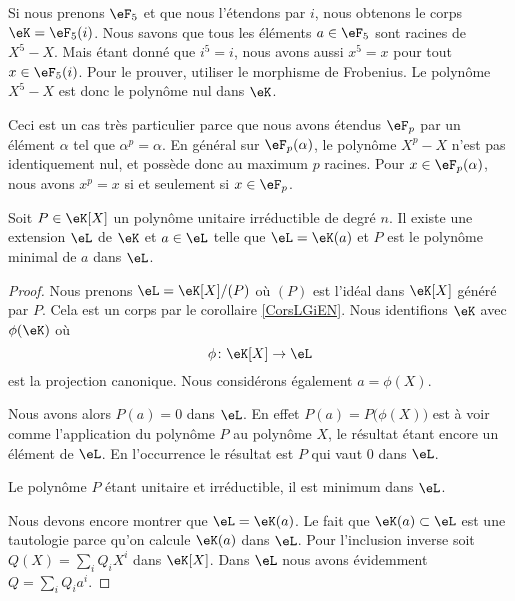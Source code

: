 \begin{example} \label{ExLQhLhJ}
    Si nous prenons \( \eF_5\) et que nous l'étendons par \( i\), nous obtenons le corps \( \eK=\eF_5(i)\). Nous savons que tous les éléments \( a\in \eF_5\) sont racines de \( X^5-X\). Mais étant donné que \( i^5=i\), nous avons aussi \( x^5=x\) pour tout \( x\in \eF_5(i)\). Pour le prouver, utiliser le morphisme de Frobenius. Le polynôme \( X^5-X\) est donc le polynôme nul dans \( \eK\).

    Ceci est un cas très particulier parce que nous avons étendus \( \eF_p\) par un élément \( \alpha\) tel que \( \alpha^p=\alpha\). En général sur \( \eF_p(\alpha)\), le polynôme \( X^p-X\) n'est pas identiquement nul, et possède donc au maximum \( p\) racines. Pour \( x\in \eF_p(\alpha)\), nous avons \( x^p=x\) si et seulement si \( x\in \eF_p\).
\end{example}

\begin{lemma}
    Soit \( P\in\eK[X]\) un polynôme unitaire irréductible de degré \( n\). Il existe une extension \( \eL\) de \( \eK\) et \( a\in \eL\) telle que \( \eL=\eK(a)\) et \( P\) est le polynôme minimal de \( a\) dans \( \eL\).
\end{lemma}

\begin{proof}
    Nous prenons \( \eL=\eK[X]/(P)\) où \( (P)\) est l'idéal dans \( \eK[X]\) généré par \( P\). Cela est un corps par le corollaire \ref{CorsLGiEN}. Nous identifions \( \eK\) avec \( \phi(\eK)\) où
    \begin{equation}
        \phi\colon \eK[X]\to \eL 
    \end{equation}
    est la projection canonique. Nous considérons également \( a=\phi(X)\).

    Nous avons alors \( P(a)=0\) dans \( \eL\). En effet \( P(a)=P\big( \phi(X) \big)\) est à voir comme l'application du polynôme \( P\) au polynôme \( X\), le résultat étant encore un élément de \( \eL\). En l'occurrence le résultat est \( P\) qui vaut \( 0\) dans \( \eL\).

    Le polynôme \( P\) étant unitaire et irréductible, il est minimum dans \( \eL\).

    Nous devons encore montrer que \( \eL=\eK(a)\). Le fait que \( \eK(a)\subset \eL\) est une tautologie parce qu'on calcule \( \eK(a)\) dans \( \eL\). Pour l'inclusion inverse soit \( Q(X)=\sum_iQ_iX^i\) dans \( \eK[X]\). Dans \( \eL\) nous avons évidemment \( Q=\sum_iQ_ia^i\).
\end{proof}

